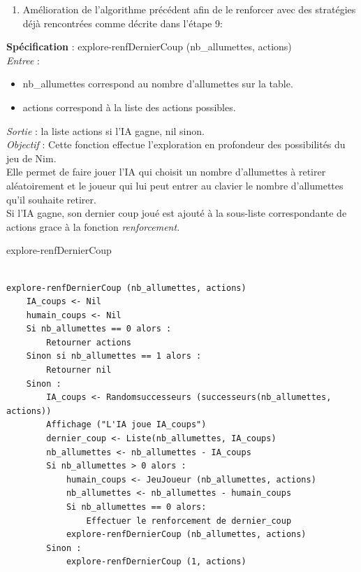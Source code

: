 \documentclass[
]{article}
\providecommand{\tightlist}{%
  \setlength{\itemsep}{0pt}\setlength{\parskip}{0pt}}
\begin{document}
\begin{enumerate}
\def\labelenumi{\arabic{enumi}.}
\setcounter{enumi}{3}
\tightlist
\item
  Amélioration de l'algorithme précédent afin de le renforcer avec des
  stratégies déjà rencontrées comme décrite dans l'étape 9:
\end{enumerate}

\textbf{Spécification} : explore-renfDernierCoup (nb\_allumettes,
actions)\\
\emph{Entree} :
\begin{itemize}
\item nb\_allumettes correspond au nombre d'allumettes sur la table.
\item actions correspond à la liste des actions possibles.
\end{itemize}

\emph{Sortie} : la liste actions si l'IA gagne, nil sinon.\\
\emph{Objectif} : Cette fonction effectue l'exploration en profondeur
des possibilités du jeu de Nim.\\
Elle permet de faire jouer l'IA qui choisit un nombre d'allumettes à
retirer aléatoirement et le joueur qui lui peut entrer au clavier le
nombre d'allumettes qu'il souhaite retirer.\\
Si l'IA gagne, son dernier coup joué est ajouté à la sous-liste
correspondante de actions grace à la fonction \emph{renforcement.}
\begin{algorithm}[H]
    \caption{explore-renfDernierCoup}
\begin{verbatim}

explore-renfDernierCoup (nb_allumettes, actions)
    IA_coups <- Nil
    humain_coups <- Nil
    Si nb_allumettes == 0 alors :
        Retourner actions
    Sinon si nb_allumettes == 1 alors :
        Retourner nil
    Sinon :
        IA_coups <- Randomsuccesseurs (successeurs(nb_allumettes, actions))
        Affichage ("L'IA joue IA_coups")
        dernier_coup <- Liste(nb_allumettes, IA_coups)
        nb_allumettes <- nb_allumettes - IA_coups
        Si nb_allumettes > 0 alors :
            humain_coups <- JeuJoueur (nb_allumettes, actions)
            nb_allumettes <- nb_allumettes - humain_coups
            Si nb_allumettes == 0 alors:
                Effectuer le renforcement de dernier_coup
            explore-renfDernierCoup (nb_allumettes, actions)
        Sinon :
            explore-renfDernierCoup (1, actions)
    \end{verbatim}
\end{algorithm}
\end{document}
